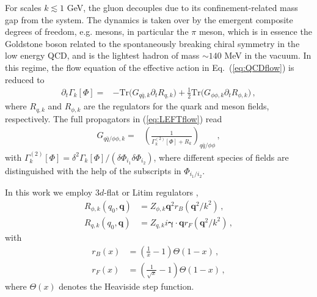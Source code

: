 \documentclass[%
reprint,
superscriptaddress,
showpacs,preprintnumbers,
amsmath,amssymb,
aps,
prd,
]{revtex4-1}
\def\Eq#1{Eq.~(\ref{#1})}
\def\eq#1{(\ref{#1})}
\begin{document}
For scales $k\lesssim 1$ GeV, the gluon decouples due to its confinement-related mass gap from the system. The dynamics is taken over by the emergent composite degrees of freedom, e.g. mesons, in particular the $\pi$ meson, which is in essence the Goldstone boson related to the spontaneously breaking chiral symmetry in the low energy QCD, and is the lightest hadron of mass $\sim 140$ MeV in the vacuum. In this regime, the flow equation of the effective action in \Eq{eq:QCDflow} is reduced to 
%
\begin{align}
\partial_t\Gamma_k[\Phi]=&-\mathrm{Tr}\Big(G_{q\bar q,k}\partial_t R_{q,k}\Big)+\frac{1}{2}\mathrm{Tr}\Big(G_{\phi\phi,k}\partial_t R_{\phi,k}\Big)\,,\label{eq:LEFTflow}
\end{align}
%
where $R_{q,k}$ and $R_{\phi,k}$ are the regulators for the quark and meson fields, respectively. The full propagators in \eq{eq:LEFTflow} read
%
\begin{align}
G_{q\bar q/\phi\phi,k}=&\left(\frac{1}{\Gamma^{(2)}_k[\Phi]+R_k}\right)_{q\bar q/\phi\phi}\,,\label{}
\end{align}
%
with $\Gamma^{(2)}_k[\Phi]=\delta^2\Gamma_k[\Phi]/(\delta \Phi_{i_1}\delta \Phi_{i_2})$, where different species of fields are distinguished with the help of the subscripts in $\Phi_{i_1/i_2}$. 
	
In this work we employ  $3d$-flat or Litim regulators \cite{Litim:2000ci, Litim:2001up, Litim:2006ag}, 
%
\begin{align}\nonumber 
R_{\phi,k}(q_0,\bm{q})&=Z_{\phi,k}\bm{q}^2 r_B(\bm{q}^2/k^2)\,, \\[2ex] 
R_{q,k}(q_0,\bm{q})&=Z_{q,k}i\bm{\gamma} \cdot \bm{q} r_F(\bm{q}^2/k^2)\,, \label{eq:Rk}
\end{align} 
%
with 
%
\begin{align}\nonumber 
r_B(x)&=\left( \frac{1}{x}-1 \right)\Theta(1-x)\,,\\[2ex] 
r_F(x)&=\left( \frac{1}{\sqrt{x}}-1 \right)\Theta(1-x)\,,  \label{eq:rk}
\end{align} 
%
where $\Theta(x)$ denotes the Heaviside step function. 
	
\end{document}
